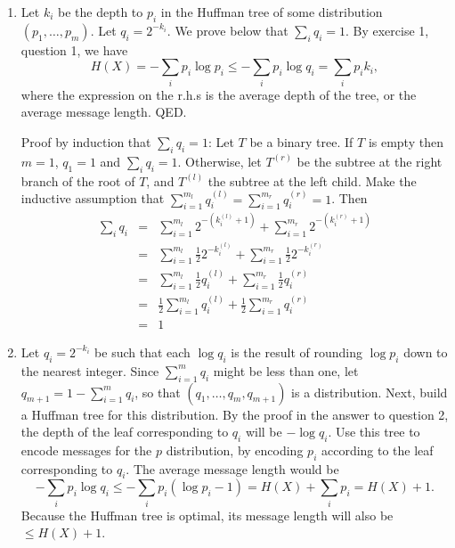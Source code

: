 \documentclass[11pt]{article} \usepackage{amssymb}
\newcommand{\half}{{\textstyle \frac12}}
\begin{document}
\begin{enumerate}
\item
Let $k_i$ be the depth to $p_i$ in the Huffman tree of some distribution
$(p_1,\ldots,p_m)$. Let $q_i=2^{-k_i}$. We prove below that $\sum_iq_i=1$. By exercise 1,
question 1, we have
\begin{equation*}
  H(X)=-\sum_ip_i\log p_i\leq -\sum_ip_i\log q_i=\sum_ip_ik_i,
\end{equation*}
where the expression on the r.h.s is the average depth of the tree, or the
average message length. QED.

Proof by induction that $\sum_iq_i=1$:
Let $T$ be a binary tree. If $T$ is empty then $m=1$, $q_1=1$ and $\sum_iq_i=1$.
Otherwise, let $T^{(r)}$ be the subtree at the right branch of the root of $T$,
and $T^{(l)}$ the subtree at the left child. Make the inductive assumption that
$\sum_{i=1}^{m_l}q_i^{(l)}=\sum_{i=1}^{m_r}q_i^{(r)}=1$. Then 
\begin{eqnarray*}
\sum_iq_i
   &=&\sum_{i=1}^{m_l}2^{-(k_i^{(l)}+1)}+\sum_{i=1}^{m_r}2^{-(k_i^{(r)}+1)}
\\ &=&\sum_{i=1}^{m_l}\half 2^{-k_i^{(l)}}+\sum_{i=1}^{m_r}\half 2^{-k_i^{(r)}}
\\ &=&\sum_{i=1}^{m_l}\half q_i^{(l)}+\sum_{i=1}^{m_r}\half q_i^{(r)}
\\ &=&\half\sum_{i=1}^{m_l}q_i^{(l)}+\half\sum_{i=1}^{m_r}q_i^{(r)}
\\ &=& 1
\end{eqnarray*}

\item
Let $q_i=2^{-k_i}$ be such that each $\log q_i$ is the result of 
rounding $\log p_i$ down to the nearest integer.
Since $\sum_{i=1}^mq_i$ might be less than one, let $q_{m+1}=1-\sum_{i=1}^mq_i$,
so that $(q_1,\ldots,q_m,q_{m+1})$ is a distribution. Next, build a Huffman
tree for this distribution. By the proof in the answer to question 2, 
the depth of the leaf corresponding
to $q_i$ will be $-\log q_i$. Use this tree to encode messages for the $p$
distribution, by encoding $p_i$ according to the leaf corresponding
to $q_i$. The average message length would be 
\begin{equation*}
  -\sum_ip_i\log q_i \leq -\sum_ip_i(\log p_i-1) = H(X)+\sum_ip_i=H(X)+1.
\end{equation*}
Because the Huffman tree is optimal, its message length will also be $\leq H(X)+1$.
\end{enumerate}
\end{document}

